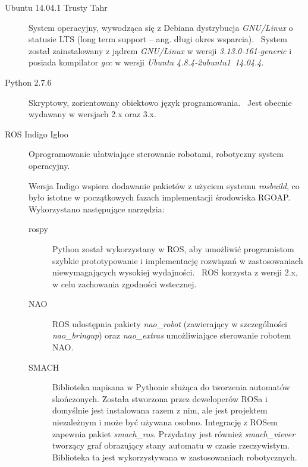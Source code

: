 \begin{description}
\item[Ubuntu 14.04.1 Trusty Tahr] {System operacyjny, wywodząca się z Debiana dystrybucja \textit{GNU/Linux} o statusie LTS (long term support – ang. długi okres wsparcia).~\cite{UBUN} %
System został zainstalowany z jądrem \textit{GNU/Linux} w wersji \textit{3.13.0-161-generic} i posiada kompilator \textit{gcc} w wersji \textit{Ubuntu 4.8.4-2ubuntu1~14.04.4}.}

\item[Python 2.7.6] {Skryptowy, zorientowany obiektowo język programowania.~\cite{PYTH2} Jest obecnie wydawany w wersjach 2.x oraz 3.x.}

\item[ROS Indigo Igloo] {Oprogramowanie ułatwiające sterowanie robotami, robotyczny system operacyjny.~\cite{ROS} %

Wersja Indigo wspiera dodawanie pakietów z użyciem systemu \textit{rosbuild}, co było istotne w początkowych fazach implementacji środowiska RGOAP. Wykorzystano następujące narzędzia:
\begin{description}
\item[rospy] {Python został wykorzystany w ROS, aby umożliwić programistom szybkie prototypowanie i implementację rozwiązań w zastosowaniach niewymagających wysokiej wydajności.~\cite{ROSPY} ROS korzysta z wersji 2.x, w celu zachowania zgodności wstecznej.}
\item[NAO] {ROS udostępnia pakiety \textit{nao\_robot} (zawierający w szczególności \textit{nao\_bringup}) oraz \textit{nao\_extras} umożliwiające sterowanie robotem NAO.~\cite{ROSnao}}
\item[SMACH] {Biblioteka napisana w Pythonie służąca do tworzenia automatów skończonych. Została stworzona przez deweloperów ROSa i domyślnie jest instalowana razem z nim, ale jest projektem niezależnym i może być używana osobno. Integrację z ROSem zapewnia pakiet \textit{smach\_ros}. Przydatny jest również \textit{smach\_viever} tworzący graf obrazujący stany automatu w czasie rzeczywistym. Biblioteka ta jest wykorzystywana w zastosowaniach robotycznych.~\cite{FOUK}}


\end{description}}
\end{description}
